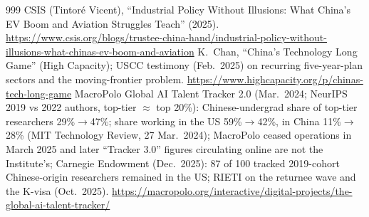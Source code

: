 \begin{thebibliography}{999}
 CSIS (Tintor\'e Vicent), ``Industrial Policy Without Illusions: What China's EV Boom and Aviation Struggles Teach'' (2025). \url{https://www.csis.org/blogs/trustee-china-hand/industrial-policy-without-illusions-what-chinas-ev-boom-and-aviation}
 K.~Chan, ``China's Technology Long Game'' (High Capacity); USCC testimony (Feb.\ 2025) on recurring five-year-plan sectors and the moving-frontier problem. \url{https://www.highcapacity.org/p/chinas-tech-long-game}
 MacroPolo Global AI Talent Tracker 2.0 (Mar.\ 2024; NeurIPS 2019 vs 2022 authors, top-tier $\approx$ top 20\%): Chinese-undergrad share of top-tier researchers 29\%$\rightarrow$47\%; share working in the US 59\%$\rightarrow$42\%, in China 11\%$\rightarrow$28\% (MIT Technology Review, 27 Mar.\ 2024); MacroPolo ceased operations in March 2025 and later ``Tracker 3.0'' figures circulating online are not the Institute's; Carnegie Endowment (Dec.\ 2025): 87 of 100 tracked 2019-cohort Chinese-origin researchers remained in the US; RIETI on the returnee wave and the K-visa (Oct.\ 2025). \url{https://macropolo.org/interactive/digital-projects/the-global-ai-talent-tracker/}


\end{thebibliography}
